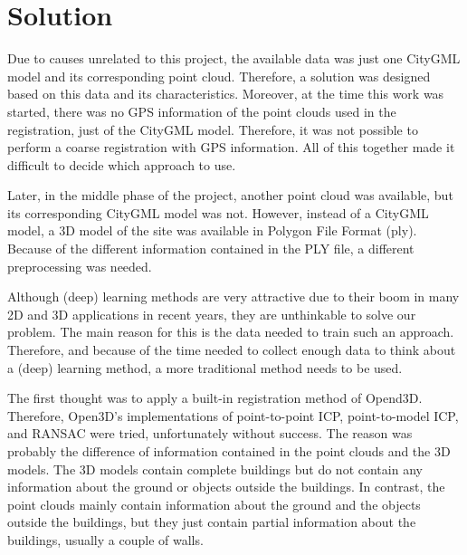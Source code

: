 

    \chapter{Solution}
    \label{chap:Solution}
        Due to causes unrelated to this project, the available data was just one CityGML model and its corresponding point cloud.
        Therefore, a solution was designed based on this data and its characteristics.
        Moreover, at the time this work was started, there was no GPS information of the point clouds used in the registration, just of the CityGML model. 
        Therefore, it was not possible to perform a coarse registration with GPS information.
        All of this together made it difficult to decide which approach to use.

        Later, in the middle phase of the project, another point cloud was available, but its corresponding CityGML model was not.
        However, instead of a CityGML model, a 3D model of the site was available in Polygon File Format (ply).
        Because of the different information contained in the PLY file, a different preprocessing was needed.

        Although (deep) learning methods are very attractive due to their boom in many 2D and 3D applications in recent years, 
        they are unthinkable to solve our problem. The main reason for this is the data needed to train such an approach. 
        Therefore, and because of the time needed to collect enough data to think about a (deep) learning method, 
        a more traditional method needs to be used.

        The first thought was to apply a built-in registration method of Opend3D. 
        Therefore, Open3D’s implementations of point-to-point ICP, point-to-model ICP, and RANSAC were tried, unfortunately without success. 
        The reason was probably the difference of information contained in the point clouds and the 3D models. 
        The 3D models contain complete buildings but do not contain any information about the ground or objects outside the buildings. 
        In contrast, the point clouds mainly contain information about the ground and the objects outside the buildings, 
        but they just contain partial information about the buildings, usually a couple of walls.

